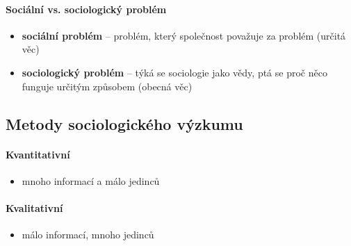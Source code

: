 \paragraph{Sociální vs. sociologický problém}
\begin{itemize}
\item \textbf{sociální problém} -- problém, který společnost považuje za problém (určitá věc)
\item \textbf{sociologický problém} -- týká se sociologie jako vědy, ptá se proč něco funguje určitým způsobem (obecná věc)
\end{itemize}

\subsection{Metody sociologického výzkumu}
\paragraph{Kvantitativní}
\begin{itemize}
\item mnoho informací a málo jedinců
\end{itemize}
\paragraph{Kvalitativní}
\begin{itemize}
\item málo informací, mnoho jedinců
\end{itemize}


